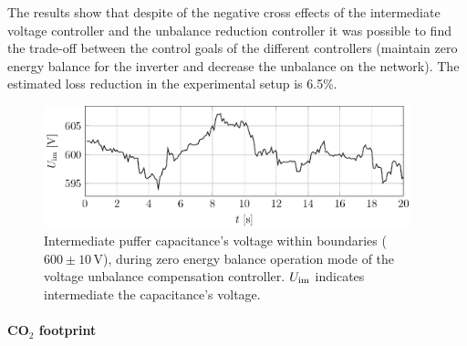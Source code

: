             The results show that despite of the negative cross effects of the intermediate voltage controller and the unbalance reduction controller it was possible to find the trade-off between the control goals of the different controllers (maintain zero energy balance for the inverter and decrease the unbalance on the network). The estimated loss reduction in the experimental setup is 6.5\%.
            \begin{figure}[ht]
            \centering
            \includegraphics[width=0.95\textwidth]{Unblance_EPS_Pics/UnbalRedComp_JCP-figure7.eps}
                 \caption{Intermediate puffer capacitance's voltage within boundaries ($600\pm10$\,V), during zero energy balance operation mode of the voltage unbalance compensation controller. $U_{\textnormal{im}}$ indicates intermediate the capacitance's voltage.}
                 \label{fig:u_inter}
                \end{figure}

        \paragraph[CO2 footprint]{CO$_2$ footprint}

